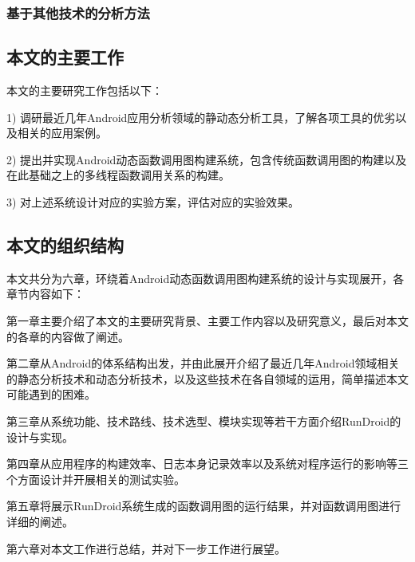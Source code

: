 \begin{comment}
CopperDroid points out how their system call-centric analysis and stimulation techniques can comprehensively expose Android malware behaviors. CopperDroid also comes with a web interface where users can submit unknown applications for analysis. 6.3.10 Closed frameworks A number of additional dynamic analysis platforms have been implemented and made available to the public via web applications. These frameworks, however, come with very little documentation on how they operate which makes it hard to make statements on any new approaches used by these implementations. It is likely that these platforms use (modified versions of) existing tools like DroidBox, TaintDroid and Androguard to complement their dynamic analysis engine. This is confirmed on SandDroid’s webpage, which states that it is powered by both DroidBox and Androguard7 . Example output reports of both ForeSafe8 and JoeSecurity9 suggest that these platforms use a combination of existing tools as well.

\end{comment}

\subsubsection{基于其他技术的分析方法}

\subsection{	本文的主要工作}

本文的主要研究工作包括以下：

1)	调研最近几年Android应用分析领域的静动态分析工具，了解各项工具的优劣以及相关的应用案例。

2)	提出并实现Android动态函数调用图构建系统，包含传统函数调用图的构建以及在此基础之上的多线程函数调用关系的构建。

3)	对上述系统设计对应的实验方案，评估对应的实验效果。

\subsection{本文的组织结构}

本文共分为六章，环绕着Android动态函数调用图构建系统的设计与实现展开，各章节内容如下：

第一章主要介绍了本文的主要研究背景、主要工作内容以及研究意义，最后对本文的各章的内容做了阐述。

第二章从Android的体系结构出发，并由此展开介绍了最近几年Android领域相关的静态分析技术和动态分析技术，以及这些技术在各自领域的运用，简单描述本文可能遇到的困难。

第三章从系统功能、技术路线、技术选型、模块实现等若干方面介绍RunDroid的设计与实现。

第四章从应用程序的构建效率、日志本身记录效率以及系统对程序运行的影响等三个方面设计并开展相关的测试实验。

第五章将展示RunDroid系统生成的函数调用图的运行结果，并对函数调用图进行详细的阐述。

第六章对本文工作进行总结，并对下一步工作进行展望。
